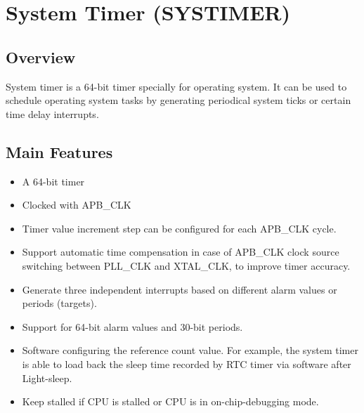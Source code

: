 \documentclass[main\_\_EN.tex]{subfiles}
\begin{document}
\setenglishformatting

\ifglobal
\else
    \listoftodos
    {\let\clearpage\relax \listofdonetodos}
    \tableofcontents
\fi




\hypertarget{systimer}{}
\chapter{System Timer (SYSTIMER)}
\label{mod:systimer}


\section{Overview}
System timer is a 64-bit timer specially for operating system. It can be used to schedule operating system tasks by generating periodical system ticks or certain time delay interrupts.

\section{Main Features}
\begin{itemize}
    \item A 64-bit timer
    \item Clocked with APB\_CLK
    \item Timer value increment step can be configured for each APB\_CLK cycle.
    \item Support automatic time compensation in case of APB\_CLK clock source switching between PLL\_CLK and XTAL\_CLK, to improve timer accuracy.
    \item Generate three independent interrupts based on different alarm values or periods (targets).
    \item Support for 64-bit alarm values and 30-bit periods.
    \item Software configuring the reference count value. For example, the system timer is able to load back the sleep time recorded by RTC timer via software after Light-sleep.
    \item Keep stalled if CPU is stalled or CPU is in on-chip-debugging mode.
\end{itemize}
\end{document}
